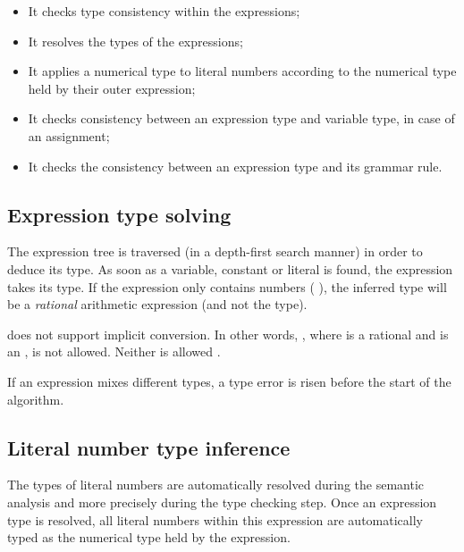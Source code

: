\begin{itemize}
	\item It checks type consistency within the expressions;
	\item It resolves the types of the expressions;
	\item It applies a numerical type to literal numbers according to the numerical type held by their outer expression;
	\item It checks consistency between an expression type and variable type, in case of an assignment;
	\item It checks the consistency between an expression type and its grammar rule.
\end{itemize}

\subsection{Expression type solving}

The expression tree is traversed (in a depth-first search manner) in order to deduce its type.
As soon as a variable, constant or literal is found, the expression takes its type.
If the expression only contains numbers (\eg{} ), the inferred type will be a \emph{rational} arithmetic expression (and not the  type).

\imitator{} does not support implicit conversion.
In other words, , where  is a rational and  is an , is not allowed.
Neither is allowed .

If an expression mixes different types, a type error is risen before the start of the algorithm.


\subsection{Literal number type inference}

The types of literal numbers are automatically resolved during the semantic analysis and more precisely during the type checking step.
Once an expression type is resolved, all literal numbers within this expression are automatically typed as the numerical type held by the expression.

